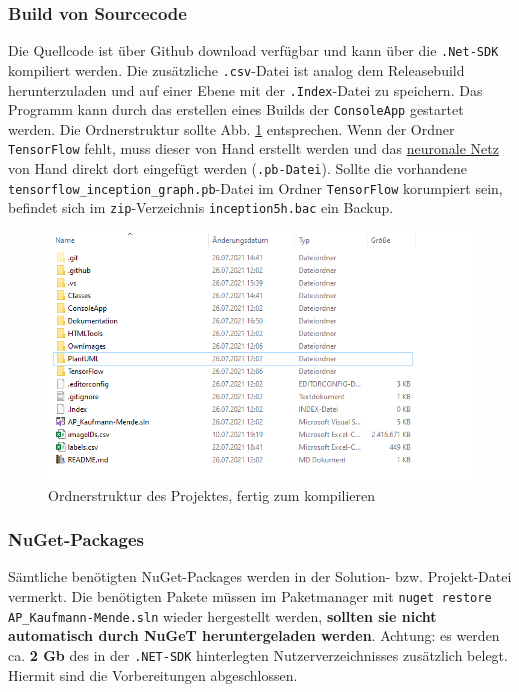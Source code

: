 \documentclass[doktyp=parbeit]{TUBAFarbeiten}
\begin{document}
\subsubsection{Build von Sourcecode}
Die Quellcode ist über Github download verfügbar und kann über die \texttt{.Net-SDK} kompiliert werden. Die zusätzliche \texttt{.csv}-Datei ist analog dem Releasebuild herunterzuladen und auf einer Ebene mit der \texttt{.Index}-Datei zu speichern. Das Programm kann durch das erstellen eines Builds der \texttt{ConsoleApp} gestartet werden. Die Ordnerstruktur sollte Abb. \ref{fig:github} entsprechen. Wenn der Ordner \texttt{TensorFlow} fehlt, muss dieser von Hand erstellt werden und das \href{https://storage.googleapis.com/download.tensorflow.org/models/inception5h.zip}{neuronale Netz} von Hand direkt dort eingefügt werden (\texttt{.pb-Datei}). Sollte die vorhandene \texttt{tensorflow\_inception\_graph.pb}-Datei im Ordner \texttt{TensorFlow} korumpiert sein, befindet sich im \texttt{zip}-Verzeichnis \texttt{inception5h.bac} ein Backup.
\begin{figure}
	\centering
	\includegraphics[width=0.7\linewidth]{Bilder/github}
	\caption{Ordnerstruktur des Projektes, fertig zum kompilieren}
	\label{fig:github}
\end{figure}
\subsubsection*{NuGet-Packages}
Sämtliche benötigten NuGet-Packages werden in der Solution- bzw. Projekt-Datei vermerkt. Die benötigten Pakete müssen im Paketmanager mit \texttt{nuget restore AP\_Kaufmann-Mende.sln} wieder hergestellt werden, \textbf{sollten sie nicht automatisch durch NuGeT heruntergeladen werden}. Achtung: es werden ca. \textbf{2 Gb} des in der \texttt{.NET-SDK} hinterlegten Nutzerverzeichnisses zusätzlich belegt. Hiermit sind die Vorbereitungen abgeschlossen.	
\end{document}
